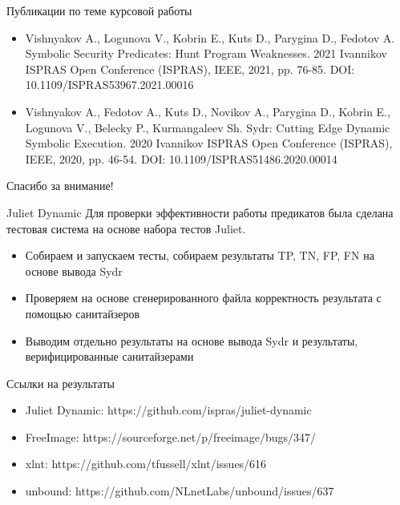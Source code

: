 \documentclass[10pt]{beamer}
\begin{document}
\begin{frame}{Публикации по теме курсовой работы}
    \begin{itemize}
        \item Vishnyakov A., Logunova V., Kobrin E., Kuts D., Parygina D., Fedotov A. Symbolic Security Predicates: Hunt Program Weaknesses. 2021 Ivannikov ISPRAS Open Conference (ISPRAS), IEEE, 2021, pp. 76-85. DOI: 10.1109/ISPRAS53967.2021.00016
        \item Vishnyakov A., Fedotov A., Kuts D., Novikov A., Parygina D., Kobrin E., Logunova V., Belecky P., Kurmangaleev Sh. Sydr: Cutting Edge Dynamic Symbolic Execution. 2020 Ivannikov ISPRAS Open Conference (ISPRAS), IEEE, 2020, pp. 46-54. DOI: 10.1109/ISPRAS51486.2020.00014
    \end{itemize}
\end{frame}

\appendix
\begin{frame}[standout] \vfill Спасибо за внимание! \vfill \end{frame}

\begin{frame}{Juliet Dynamic}
Для проверки эффективности работы предикатов была сделана тестовая система на
основе набора тестов Juliet.
\begin{itemize}
    \item Собираем и запускаем тесты, собираем результаты TP, TN, FP, FN на
        основе вывода Sydr
    \item Проверяем на основе сгенерированного файла корректность результата с
        помощью санитайзеров
    \item Выводим отдельно результаты на основе вывода Sydr и результаты,
        верифицированные санитайзерами
\end{itemize}
\end{frame}

\begin{frame}{Ссылки на результаты}
\begin{itemize}
    \item Juliet Dynamic: https://github.com/ispras/juliet-dynamic
    \item FreeImage: https://sourceforge.net/p/freeimage/bugs/347/
    \item xlnt: https://github.com/tfussell/xlnt/issues/616
    \item unbound: https://github.com/NLnetLabs/unbound/issues/637
\end{itemize}
\end{frame}
\end{document}
